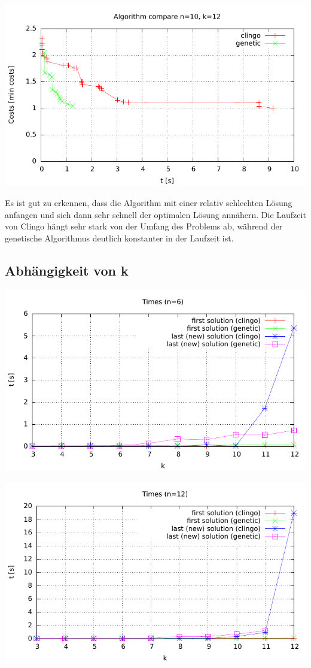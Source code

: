 \includegraphics{../../plots/algorithmCompare-n10-k12.pdf}


Es ist gut zu erkennen, dass die Algorithm mit einer relativ schlechten Lösung anfangen und sich dann sehr schnell der optimalen Lösung annähern. Die Laufzeit von Clingo hängt sehr stark von der Umfang des Problems ab, während der genetische Algorithmus deutlich konstanter in der Laufzeit ist.


\subsection{Abhängigkeit von k}

\includegraphics{../../plots/timesPerK-n6.pdf}

\includegraphics{../../plots/timesPerK-n12.pdf}


